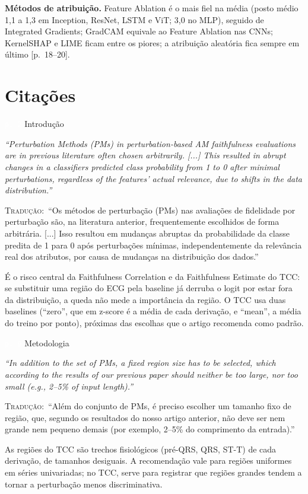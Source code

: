 \documentclass[11pt,a4paper]{article}
\newcommand{\pagechip}[1]{{\setlength{\fboxsep}{1.5pt}\colorbox{cAcc}{\textcolor{white}{\scriptsize\texttt{#1}}}}}
\newenvironment{origquote}{\par\itshape\small}{\par}
\newenvironment{tradquote}{\par\small\textsc{Tradução:}\ }{\par}
\newcommand{\explab}[1]{\par\smallskip{\small\color{cAcc}\textbf{\MakeUppercase{#1}}}\par}
\begin{document}
\textbf{Métodos de atribuição.} Feature Ablation é o mais fiel na média (posto médio 1,1 a 1,3 em Inception, ResNet, LSTM e ViT; 3,0 no MLP), seguido de Integrated Gradients; GradCAM equivale ao Feature Ablation nas CNNs; KernelSHAP e LIME ficam entre os piores; a atribuição aleatória fica sempre em último [p.~18--20].

\section{Citações}

\begin{citacard}{\pagechip{p. 2} Introdução}
\begin{origquote}“Perturbation Methods (PMs) in perturbation-based AM faithfulness evaluations are in previous literature often chosen arbitrarily. [...] This resulted in abrupt changes in a classifiers predicted class probability from 1 to 0 after minimal perturbations, regardless of the features’ actual relevance, due to shifts in the data distribution.”\end{origquote}
\begin{tradquote}“Os métodos de perturbação (PMs) nas avaliações de fidelidade por perturbação são, na literatura anterior, frequentemente escolhidos de forma arbitrária. [...] Isso resultou em mudanças abruptas da probabilidade da classe predita de 1 para 0 após perturbações mínimas, independentemente da relevância real dos atributos, por causa de mudanças na distribuição dos dados.”\end{tradquote}
\explab{Explicação}
É o risco central da Faithfulness Correlation e da Faithfulness Estimate do TCC: se substituir uma região do ECG pela baseline já derruba o logit por estar fora da distribuição, a queda não mede a importância da região. O TCC usa duas baselines (``zero'', que em z-score é a média de cada derivação, e ``mean'', a média do treino por ponto), próximas das escolhas que o artigo recomenda como padrão.
\end{citacard}

\begin{citacard}{\pagechip{p. 9} Metodologia}
\begin{origquote}“In addition to the set of PMs, a fixed region size has to be selected, which according to the results of our previous paper should neither be too large, nor too small (e.g., 2–5\% of input length).”\end{origquote}
\begin{tradquote}“Além do conjunto de PMs, é preciso escolher um tamanho fixo de região, que, segundo os resultados do nosso artigo anterior, não deve ser nem grande nem pequeno demais (por exemplo, 2–5\% do comprimento da entrada).”\end{tradquote}
\explab{Explicação}
As regiões do TCC são trechos fisiológicos (pré-QRS, QRS, ST-T) de cada derivação, de tamanhos desiguais. A recomendação vale para regiões uniformes em séries univariadas; no TCC, serve para registrar que regiões grandes tendem a tornar a perturbação menos discriminativa.
\end{citacard}
\end{document}
